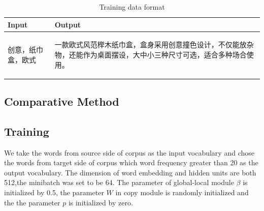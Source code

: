 \documentclass[sigconf]{acmart}
\begin{document}
\begin{table}
\caption{Training data format }\label{table:format}
\begin{center}
\begin{tabular}{p{2.5cm}p{5cm}}
    \toprule
    Input & Output \\
    \midrule
    \begin{CJK*}{UTF8}{gbsn}
        创意，纸巾盒，欧式
    \end{CJK*} &
    \begin{CJK*}{UTF8}{gbsn}
        一款欧式风范榉木纸巾盒，盒身采用创意撞色设计，不仅能放杂物，还能作为桌面摆设，大中小三种尺寸可选，适合多种场合使用。
    \end{CJK*} \\
    \bottomrule
\end{tabular}
\end{center}
\end{table}

\subsection{Comparative Method}

\subsection{Training}
We take the words from source side of corpus as the input vocabulary and chose the words from target side of corpus which word frequency greater than 20 as the output vocabulary. The dimension of word embedding and hidden units are both 512,the minibatch was set to be 64. The parameter of global-local module $\beta$ is initialized by 0.5, the parameter $W$ in copy module is randomly initialized and the the parameter $p$ is initialized by zero.
\end{document}
